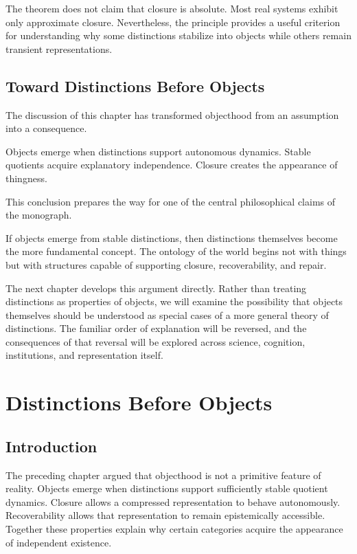 \documentclass[11pt,oneside,openany]{book}
\begin{document}
The theorem does not claim that closure is absolute. Most real systems exhibit only approximate closure. Nevertheless, the principle provides a useful criterion for understanding why some distinctions stabilize into objects while others remain transient representations.

\section{Toward Distinctions Before Objects}

The discussion of this chapter has transformed objecthood from an assumption into a consequence.

Objects emerge when distinctions support autonomous dynamics. Stable quotients acquire explanatory independence. Closure creates the appearance of thingness.

This conclusion prepares the way for one of the central philosophical claims of the monograph.

If objects emerge from stable distinctions, then distinctions themselves become the more fundamental concept. The ontology of the world begins not with things but with structures capable of supporting closure, recoverability, and repair.

The next chapter develops this argument directly. Rather than treating distinctions as properties of objects, we will examine the possibility that objects themselves should be understood as special cases of a more general theory of distinctions. The familiar order of explanation will be reversed, and the consequences of that reversal will be explored across science, cognition, institutions, and representation itself.

\chapter{Distinctions Before Objects}

\section{Introduction}

The preceding chapter argued that objecthood is not a primitive feature of reality. Objects emerge when distinctions support sufficiently stable quotient dynamics. Closure allows a compressed representation to behave autonomously. Recoverability allows that representation to remain epistemically accessible. Together these properties explain why certain categories acquire the appearance of independent existence.
\end{document}
